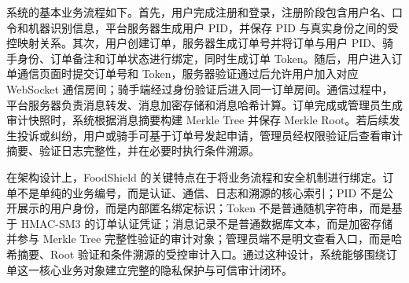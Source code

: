 系统的基本业务流程如下。首先，用户完成注册和登录，注册阶段包含用户名、口令和机器识别信息，平台服务器生成用户 PID，并保存 PID 与真实身份之间的受控映射关系。其次，用户创建订单，服务器生成订单号并将订单与用户 PID、骑手身份、订单备注和订单状态进行绑定，同时生成订单 Token。随后，用户进入订单通信页面时提交订单号和 Token，服务器验证通过后允许用户加入对应 WebSocket 通信房间；骑手端经过身份验证后进入同一订单房间。通信过程中，平台服务器负责消息转发、消息加密存储和消息哈希计算。订单完成或管理员生成审计快照时，系统根据消息摘要构建 Merkle Tree 并保存 Merkle Root。若后续发生投诉或纠纷，用户或骑手可基于订单号发起申请，管理员经权限验证后查看审计摘要、验证日志完整性，并在必要时执行条件溯源。

在架构设计上，FoodShield 的关键特点在于将业务流程和安全机制进行绑定。订单不是单纯的业务编号，而是认证、通信、日志和溯源的核心索引；PID 不是公开展示的用户身份，而是内部匿名绑定标识；Token 不是普通随机字符串，而是基于 HMAC-SM3 的订单认证凭证；消息记录不是普通数据库文本，而是加密存储并参与 Merkle Tree 完整性验证的审计对象；管理员端不是明文查看入口，而是哈希摘要、Root 验证和条件溯源的受控审计入口。通过这种设计，系统能够围绕订单这一核心业务对象建立完整的隐私保护与可信审计闭环。
